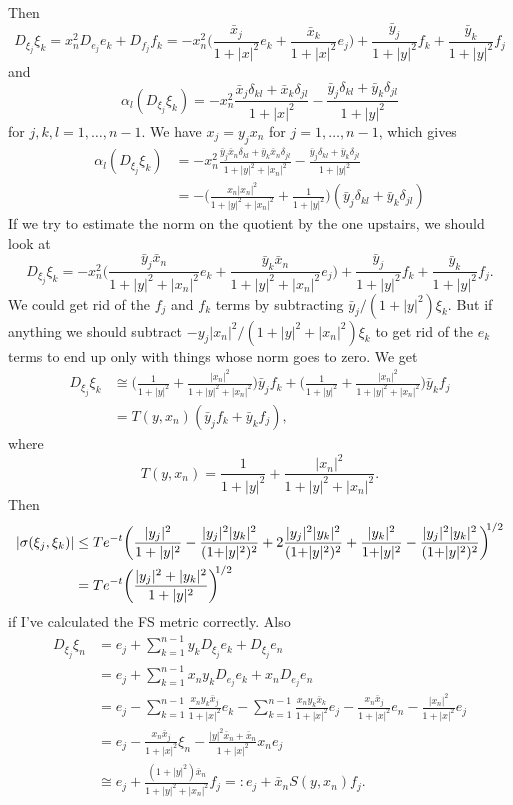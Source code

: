 \documentclass[10pt,a4paper]{amsart}
\begin{document}
Then
$$
D_{\xi_j} \xi_k
= x_n^2 D_{e_j} e_k + D_{f_j} f_k
= -x_n^2
\biggl(
\frac{\bar x_j}{1+|x|^2} e_k
+ \frac{\bar x_k}{1+|x|^2} e_j
\biggr)
+ \frac{\bar y_j}{1+|y|^2} f_k + \frac{\bar y_k}{1+|y|^2} f_j
$$
and
$$
\alpha_l(D_{\xi_j}\xi_k)
= -x_n^2
\frac{\bar x_j \delta_{kl} + \bar x_k \delta_{jl}}{1+|x|^2}
- \frac{\bar y_j \delta_{kl} + \bar y_k \delta_{jl}}{1+|y|^2}
$$
for $j,k,l = 1, \ldots, n-1$.
We have $x_j = y_j x_n$ for $j=1,\ldots,n-1$, which gives
\begin{align*}
\alpha_l(D_{\xi_j}\xi_k)
&= -x_n^2
\frac{\bar y_j \bar x_n \delta_{kl} + \bar y_k \bar x_n \delta_{jl}}{1+|y|^2+|x_n|^2}
- \frac{\bar y_j \delta_{kl} + \bar y_k \delta_{jl}}{1+|y|^2}
\\
&= -
\biggl(
\frac{x_n |x_n|^2}{1+|y|^2+|x_n|^2}
+ \frac{1}{1+|y|^2}
\biggr)(\bar y_j \delta_{kl} + \bar y_k \delta_{jl})
\end{align*}
If we try to estimate the norm on the quotient by the one upstairs, we
should look at
$$
D_{\xi_j} \xi_k
=  -x_n^2
\biggl(
\frac{\bar y_j \bar x_n}{1+|y|^2+|x_n|^2} e_k
+ \frac{\bar y_k \bar x_n}{1+|y|^2+|x_n|^2} e_j
\biggr)
+ \frac{\bar y_j}{1+|y|^2} f_k + \frac{\bar y_k}{1+|y|^2} f_j.
$$
We could get rid of the $f_j$ and $f_k$ terms by subtracting $\bar y_j / (1+|y|^2) \xi_k$.
But if anything we should subtract $-y_j|x_n|^2/(1+|y|^2+|x_n|^2) \xi_k$ to get
rid of the $e_k$ terms to end up only with things whose norm goes to zero.
We get
\begin{align*}
D_{\xi_j} \xi_k
&\cong
\biggl(
\frac{1}{1+|y|^2}
+ \frac{|x_n|^2}{1+|y|^2+|x_n|^2}
\biggr)
\bar y_j f_k
+ \biggl(
\frac{1}{1+|y|^2}
+ \frac{|x_n|^2}{1+|y|^2+|x_n|^2}
\biggr)
\bar y_k
f_j
\\
&= T(y,x_n) (\bar y_j f_k + \bar y_k f_j),
\end{align*}
where
$$
T(y,x_n) =
\frac{1}{1+|y|^2}
+ \frac{|x_n|^2}{1+|y|^2+|x_n|^2}.
$$
Then
\begin{align*}
|\sigma(\xi_j,\xi_k)|
&\leq Te^{-t}\biggl(
\frac{|y_j|^2}{1+|y|^2}
- \frac{|y_j|^2|y_k|^2}{(1{+}|y|^2)^2}
+ 2\frac{|y_j|^2 |y_k|^2}{(1{+}|y|^2)^2}
+ \frac{|y_k|^2}{1{+}|y|^2}
- \frac{|y_j|^2|y_k|^2}{(1{+}|y|^2)^2}
\biggr)^{\mkern-6mu 1/2}
\\
&=
Te^{-t}\biggl(
\frac{|y_j|^2 + |y_k|^2}{1+|y|^2}
\biggr)^{\mkern-6mu 1/2}
\end{align*}
if I've calculated the FS metric correctly.
Also
\begin{align*}
D_{\xi_j} \xi_n
&= e_j
+ \sum_{k=1}^{n-1} y_k D_{\xi_j} e_k
+ D_{\xi_j} e_n
\\
&= e_j
+ \sum_{k=1}^{n-1} x_n y_k D_{e_j} e_k
+ x_n D_{e_j} e_n
\\
&= e_j
- \sum_{k=1}^{n-1}
\frac{x_n y_k \bar x_j}{1+|x|^2} e_k
- \sum_{k=1}^{n-1}
\frac{x_n y_k \bar x_k}{1+|x|^2} e_j
- \frac{x_n \bar x_j}{1+|x|^2} e_n
- \frac{|x_n|^2}{1+|x|^2} e_j
\\
&= e_j
- \frac{x_n\bar x_j}{1+|x|^2} \xi_n
- \frac{|y|^2 \bar x_n + \bar x_n}{1+|x|^2}
x_n e_j
\\
&\cong
e_j + \frac{(1 + |y|^2)\bar x_n}{1+|y|^2+|x_n|^2} f_j
=: e_j + \bar x_n S(y,x_n) f_j.
\end{align*}
\end{document}
